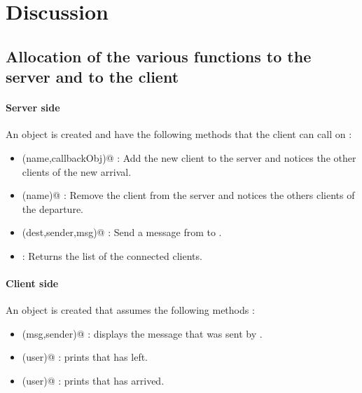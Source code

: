 \documentclass{article}
\begin{document}
\newpage


\section{Discussion}

\subsection{Allocation of the various functions to the server and to the client}
\paragraph{Server side}
An object \verb@myIRCObject@ is created and have the following methods that the client can call on : 
\begin{itemize}
\item \verb@connect(name,callbackObj)@ : Add the new client to the server and notices the other clients of the new arrival.
\item \verb@disconnect(name)@ : Remove the client from the server and notices the others clients of the departure.
\item \verb@sendMsg(dest,sender,msg)@ : Send a message \verb@msg@ from \verb@sender@ to \verb@dest@.
\item \verb@who@ : Returns the list of the connected clients.
\end{itemize}

\paragraph{Client side}
An object \verb@myIRCCallbackImpl@ is created that assumes the following methods :
\begin{itemize}
\item \verb@receiveMsg(msg,sender)@ : displays the message \verb@msg@ that was sent by \verb@sender@.
\item \verb@left(user)@ : prints that \verb@user@ has left.
\item \verb@arrived(user)@ : prints that \verb@user@ has arrived.
\end{itemize}
\end{document}
